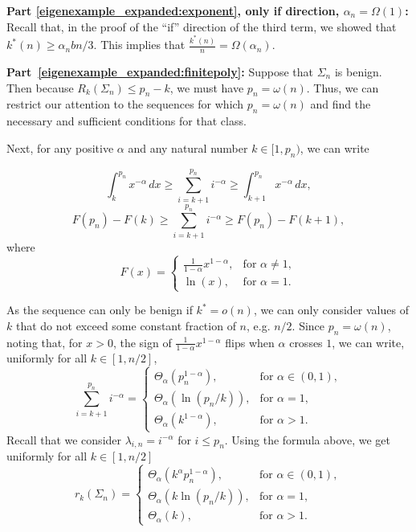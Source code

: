\documentclass[11pt,notitlepage]{article}
\begin{document}
\noindent
{\bf Part \ref{eigenexample_expanded:exponent}, only if direction, $\alpha_n = \Omega(1)$:}  
Recall that, in the proof of the ``if'' direction of
the third term, we showed that $k^*(n) \geq \alpha_n b n/3$.
This implies that $\frac{k^*(n)}{n} = \Omega(\alpha_n)$.

\noindent
{\bf Part~\ref{eigenexample_expanded:finitepoly}:}
Suppose that $\Sigma_n$ is benign. Then because
$R_{k}(\Sigma_n)\le p_n-k$, we must have $p_n=\omega(n)$. Thus, we can restrict our attention to the sequences for which $p_n = \omega(n)$ and find the necessary and sufficient conditions for that class.

Next, for any positive $\alpha$ and any natural number
$k \in [1, p_n)$, we can write 

\begin{equation*}
 \int_{k}^{p_n}x^{-\alpha}\,dx \geq \sum_{i = k+1}^{p_n} i^{-\alpha} \geq \int_{k+1}^{p_n}x^{-\alpha}\,dx,
\end{equation*}
\begin{equation*}
F(p_n) - F(k) \geq \sum_{i = k+1}^{p_n} i^{-\alpha} \geq F(p_n) - F(k+1),
\end{equation*}
where 
\[
	F(x) = \begin{cases} \frac{1}{1-\alpha}x^{1-\alpha},& \text{for }\alpha \neq 1,\\
	\ln(x),&  \text{for }\alpha = 1.\end{cases}
\]

As the sequence can only be benign if $k^\ast = o(n)$, we can only consider values of $k$ that do not exceed some constant fraction of $n$, e.g. $n/2$. 
 Since $p_n = \omega(n)$,  
 noting that, for $x > 0$, the
 sign of $\frac{1}{1 - \alpha} x^{1-\alpha}$ flips
 when $\alpha$ crosses $1$,
 we can write, uniformly for all
 $k \in [1, n/2]$,
 \[
	 \sum_{i = k+1}^{p_n} i^{-\alpha} = \begin{cases}
	 \Theta_\alpha\left(p_n^{1-\alpha}\right),& \text{for }\alpha \in (0,1),\\
	 \Theta_\alpha\left(\ln(p_n/k)\right), &\text{for }\alpha = 1,\\
	 \Theta_\alpha\left(k^{1-\alpha}\right),&  \text{for }\alpha > 1.
	 \end{cases}
\] 
 Recall that we consider $\lambda_{i,n} = i^{-\alpha}$ for $i \leq p_n$. 
Using the formula above, we get uniformly
for all $k \in [1, n/2]$
\[
r_k(\Sigma_n) =  \begin{cases}
\Theta_\alpha\left(k^\alpha p_n^{1-\alpha}\right),& \text{for }\alpha \in (0,1),\\
\Theta_\alpha\left(k\ln(p_n/k)\right), &\text{for }\alpha = 1,\\
\Theta_\alpha\left(k\right),&  \text{for }\alpha > 1.
\end{cases}
\]
\end{document}
